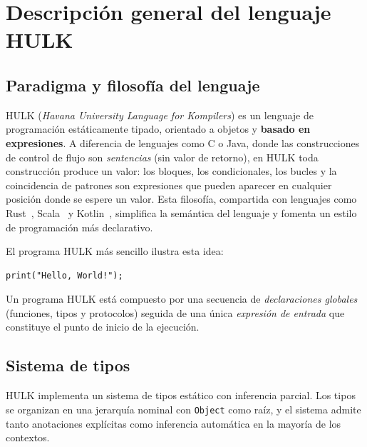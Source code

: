 \documentclass[12pt, a4paper]{article}
\begin{document}
\newpage


\section{Descripción general del lenguaje HULK}
\label{sec:hulk}

\subsection{Paradigma y filosofía del lenguaje}

HULK (\textit{Havana University Language for Kompilers}) es un lenguaje de
programación estáticamente tipado, orientado a objetos y \textbf{basado en
expresiones}. A diferencia de lenguajes como C o Java, donde las construcciones
de control de flujo son \textit{sentencias} (sin valor de retorno), en HULK toda
construcción produce un valor: los bloques, los condicionales, los bucles y la
coincidencia de patrones son expresiones que pueden aparecer en cualquier posición
donde se espere un valor. Esta filosofía, compartida con lenguajes como Rust~\cite{klabnik2019},
Scala~\cite{odersky2021} y Kotlin~\cite{jemerov2017}, simplifica la semántica del lenguaje y fomenta un estilo de
programación más declarativo.

El programa HULK más sencillo ilustra esta idea:

\begin{lstlisting}[caption={Programa mínimo en HULK}, label=lst:hello]
print("Hello, World!");
\end{lstlisting}

Un programa HULK está compuesto por una secuencia de \textit{declaraciones
globales} (funciones, tipos y protocolos) seguida de una única
\textit{expresión de entrada} que constituye el punto de inicio de la ejecución.

\subsection{Sistema de tipos}

HULK implementa un sistema de tipos estático con inferencia parcial. Los tipos
se organizan en una jerarquía nominal con \texttt{Object} como raíz, y el
sistema admite tanto anotaciones explícitas como inferencia automática en la
mayoría de los contextos.
\end{document}
